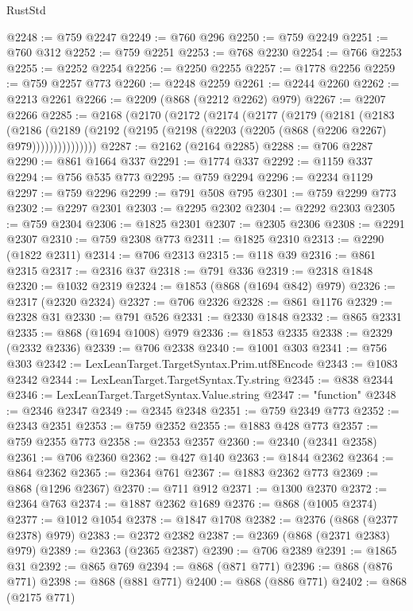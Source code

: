 \begin{lexlean}{RustStd}
\begin{coremodule}
@2248 := @759 @2247
@2249 := @760 @296
@2250 := @759 @2249
@2251 := @760 @312
@2252 := @759 @2251
@2253 := @768 @2230
@2254 := @766 @2253
@2255 := @2252 @2254
@2256 := @2250 @2255
@2257 := @1778 @2256
@2259 := @759 @2257 @773
@2260 := @2248 @2259
@2261 := @2244 @2260
@2262 := @2213 @2261
@2266 := @2209 (@868 (@2212 @2262) @979)
@2267 := @2207 @2266
@2285 := @2168
    (@2170
      (@2172
        (@2174
          (@2177
            (@2179
              (@2181
                (@2183
                  (@2186
                    (@2189
                      (@2192 (@2195 (@2198 (@2203 (@2205 (@868 (@2206 @2267) @979)))))))))))))))
@2287 := @2162 (@2164 @2285)
@2288 := @706 @2287
@2290 := @861 @1664 @337
@2291 := @1774 @337
@2292 := @1159 @337
@2294 := @756 @535 @773
@2295 := @759 @2294
@2296 := @2234 @1129
@2297 := @759 @2296
@2299 := @791 @508 @795
@2301 := @759 @2299 @773
@2302 := @2297 @2301
@2303 := @2295 @2302
@2304 := @2292 @2303
@2305 := @759 @2304
@2306 := @1825 @2301
@2307 := @2305 @2306
@2308 := @2291 @2307
@2310 := @759 @2308 @773
@2311 := @1825 @2310
@2313 := @2290 (@1822 @2311)
@2314 := @706 @2313
@2315 := @118 @39
@2316 := @861 @2315
@2317 := @2316 @37
@2318 := @791 @336
@2319 := @2318 @1848
@2320 := @1032 @2319
@2324 := @1853 (@868 (@1694 @842) @979)
@2326 := @2317 (@2320 @2324)
@2327 := @706 @2326
@2328 := @861 @1176
@2329 := @2328 @31
@2330 := @791 @526
@2331 := @2330 @1848
@2332 := @865 @2331
@2335 := @868 (@1694 @1008) @979
@2336 := @1853 @2335
@2338 := @2329 (@2332 @2336)
@2339 := @706 @2338
@2340 := @1001 @303
@2341 := @756 @303
@2342 := LexLeanTarget.TargetSyntax.Prim.utf8Encode
@2343 := @1083 @2342
@2344 := LexLeanTarget.TargetSyntax.Ty.string
@2345 := @838 @2344
@2346 := LexLeanTarget.TargetSyntax.Value.string
@2347 := "function"
@2348 := @2346 @2347
@2349 := @2345 @2348
@2351 := @759 @2349 @773
@2352 := @2343 @2351
@2353 := @759 @2352
@2355 := @1883 @428 @773
@2357 := @759 @2355 @773
@2358 := @2353 @2357
@2360 := @2340 (@2341 @2358)
@2361 := @706 @2360
@2362 := @427 @140
@2363 := @1844 @2362
@2364 := @864 @2362
@2365 := @2364 @761
@2367 := @1883 @2362 @773
@2369 := @868 (@1296 @2367)
@2370 := @711 @912
@2371 := @1300 @2370
@2372 := @2364 @763
@2374 := @1887 @2362 @1689
@2376 := @868 (@1005 @2374)
@2377 := @1012 @1054
@2378 := @1847 @1708
@2382 := @2376 (@868 (@2377 @2378) @979)
@2383 := @2372 @2382
@2387 := @2369 (@868 (@2371 @2383) @979)
@2389 := @2363 (@2365 @2387)
@2390 := @706 @2389
@2391 := @1865 @31
@2392 := @865 @769
@2394 := @868 (@871 @771)
@2396 := @868 (@876 @771)
@2398 := @868 (@881 @771)
@2400 := @868 (@886 @771)
@2402 := @868 (@2175 @771)

\end{coremodule}
\end{lexlean}
